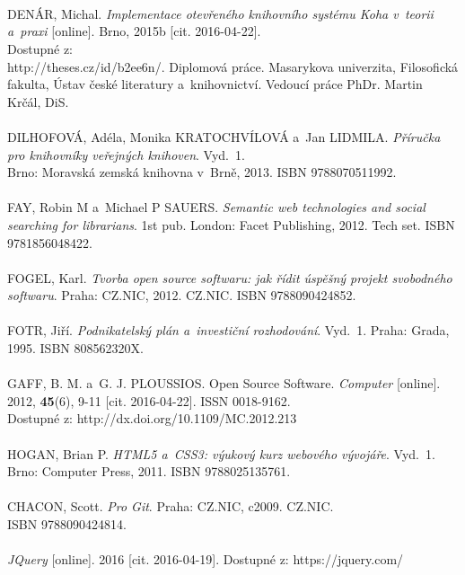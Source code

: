 \documentclass[
	11pt, oneside, printed, final, palatino
	microtype,
	table,   %
	lof,     %
	lot     %
]{fithesis3}
\begin{document}
{~\\~\\~\\ \noindent
[10] DENÁR, Michal. \textit{Implementace otevřeného knihovního systému Koha v~teorii a~praxi} [online]. Brno, 2015b [cit. 2016-04-22]. \\Dostupné z: \\http://theses.cz/id/b2ee6n/. Diplomová práce. Masarykova univerzita, Filosofická fakulta, Ústav české literatury a~knihovnictví. Vedoucí práce PhDr. Martin Krčál, DiS.
~\\ ~\\ \noindent
[11] DILHOFOVÁ, Adéla, Monika KRATOCHVÍLOVÁ a~Jan LIDMILA. \textit{Příručka pro knihovníky veřejných knihoven}. Vyd.~1. \\Brno: Moravská zemská knihovna v~Brně, 2013. ISBN 9788070511992.
~\\ ~\\ \noindent
[12] FAY, Robin M a~Michael P SAUERS. \textit{Semantic web technologies and social searching for librarians}. 1st pub. London: Facet Publishing, 2012. Tech set. ISBN 9781856048422.
~\\ ~\\ \noindent
[13] FOGEL, Karl. \textit{Tvorba open source softwaru: jak řídit úspěšný projekt svobodného softwaru}. Praha: CZ.NIC, 2012. CZ.NIC. ISBN 9788090424852.
~\\ ~\\ \noindent
[14] FOTR, Jiří. \textit{Podnikatelský plán a~investiční rozhodování}. Vyd.~1. Praha: Grada, 1995. ISBN 808562320X.
~\\ ~\\ \noindent
[15] GAFF, B. M. a~G. J. PLOUSSIOS. Open Source Software. \textit{Computer} [online]. 2012, 	\textbf{45}(6), 9-11 [cit. 2016-04-22]. ISSN 0018-9162. \\Dostupné z: http://dx.doi.org/10.1109/MC.2012.213
~\\ ~\\ \noindent
[16] HOGAN, Brian P. \textit{HTML5 a~CSS3: výukový kurz webového vývojáře}. Vyd.~1. Brno: Computer Press, 2011. ISBN 9788025135761.
~\\ ~\\ \noindent
[17] CHACON, Scott. \textit{Pro Git}. Praha: CZ.NIC, c2009. CZ.NIC. \\ISBN 9788090424814.
~\\ ~\\ \noindent
[18] \textit{JQuery} [online]. 2016 [cit. 2016-04-19]. Dostupné z: https://jquery.com/
~\\ ~\\ \noindent
}
\end{document}
